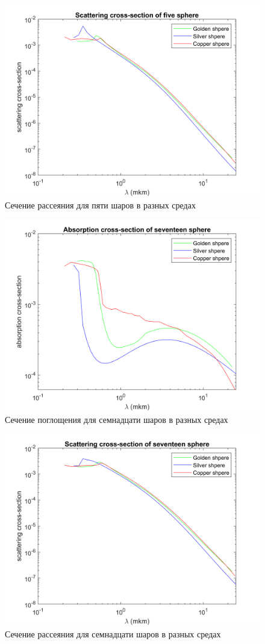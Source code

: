 \begin{figure}[h!]
	\centering
	\includegraphics[width=0.8\linewidth]{scatForFIVE}
	\caption{Сечение рассеяния для пяти шаров в разных средах}
	\label{fig:scatForFIVE}
\end{figure} 
\begin{figure}[h!]
	\centering
	\includegraphics[width=0.8\linewidth]{absorpForSEVENTEEN}
	\caption{Сечение поглощения для семнадцати шаров в разных средах}
	\label{fig:absorpForSEVENTEEN}
\end{figure}
\begin{figure}[h!]
	\centering
	\includegraphics[width=0.8\linewidth]{scatForSEVENTEEN}
	\caption{Сечение рассеяния для семнадцати шаров в разных средах}
	\label{fig:scatForSEVENTEEN}
\end{figure} 

